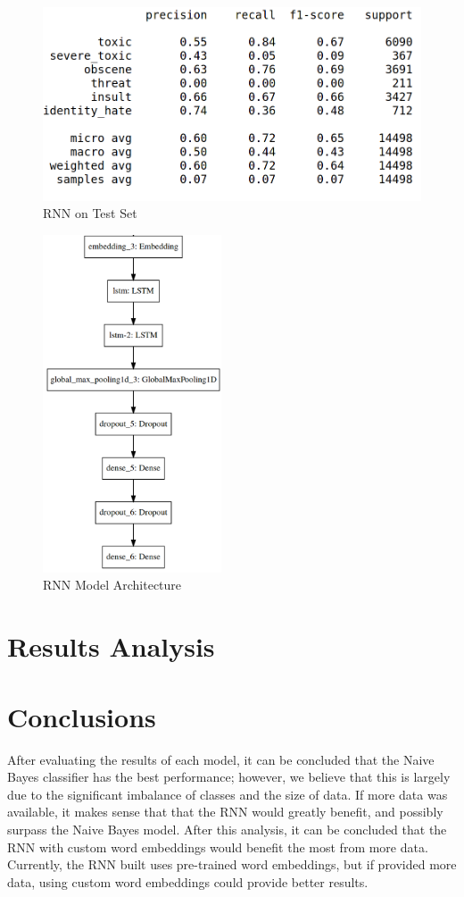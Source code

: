 \documentclass{article}
\begin{document}
{{    \begin{figure}[h]
      \centering
      \includegraphics[width=\textwidth]{rnn-test-set.png}
      \caption{RNN on Test Set}
      \label{fig:rnn-test}
    \end{figure}

    \begin{figure}[h]
      \centering
      \includegraphics[height=10cm]{model-architecture.png}
      \caption{RNN Model Architecture}
      \label{fig:model-arch}
    \end{figure}
  }
 }

\section{Results Analysis}{}

\section{Conclusions}{
  After evaluating the results of each model, it can be concluded that the Naive
  Bayes classifier has the best performance; however, we believe that this is
  largely due to the significant imbalance of classes and the size of data. If
  more data was available, it makes sense that that the RNN would greatly
  benefit, and possibly surpass the Naive Bayes model. After this analysis, it
  can be concluded that the RNN with custom word embeddings would benefit the
  most from more data. Currently, the RNN built uses pre-trained word
  embeddings, but if provided more data, using custom word embeddings could
  provide better results.
 }



\pagebreak
{}

\end{document}
